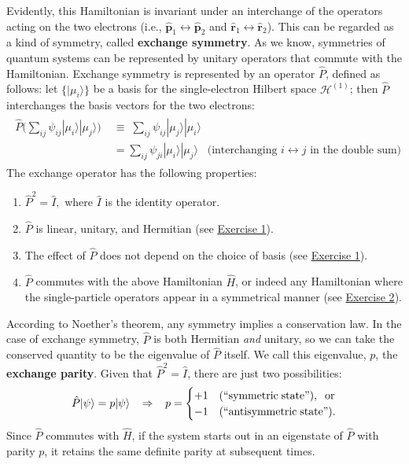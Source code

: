 \documentclass[pra,12pt]{revtex4}
\begin{document}
Evidently, this Hamiltonian is invariant under an interchange of the
operators acting on the two electrons (i.e., $\hat{\mathbf{p}}_1
\leftrightarrow \hat{\mathbf{p}}_2$ and $\hat{\mathbf{r}}_1
\leftrightarrow \hat{\mathbf{r}}_2$).  This can be regarded as a kind
of symmetry, called \textbf{exchange symmetry}.  As we know,
symmetries of quantum systems can be represented by unitary operators
that commute with the Hamiltonian.  Exchange symmetry is represented
by an operator $\hat{P}$, defined as follows: let $\{|\mu_i\rangle\}$
be a basis for the single-electron Hilbert space $\mathscr{H}^{(1)}$;
then $\hat{P}$ interchanges the basis vectors for the two electrons:
\begin{align}
  \begin{aligned}\hat{P} \Big (\sum_{ij} \psi_{ij} |\mu_i\rangle|\mu_j\rangle \Big)
    \;&\equiv\;  \sum_{ij} \psi_{ij} |\mu_j\rangle|\mu_i\rangle \\&= \sum_{ij} \psi_{ji} |\mu_i\rangle|\mu_j\rangle \;\;\;\textrm{(interchanging $i\leftrightarrow j$ in the double sum)}\end{aligned}
\end{align}
The exchange operator has the following properties:
\begin{enumerate}
\item $\hat{P}^2 = \hat{I},$ where $\hat{I}$ is the identity operator.

\item $\hat{P}$ is linear, unitary, and Hermitian (see
  \hyperref[ex:1]{Exercise 1}).
  
\item The effect of $\hat{P}$ does not depend on the choice
  of basis (see \hyperref[ex:1]{Exercise 1}).

\item $\hat{P}$ commutes with the above Hamiltonian $\hat{H}$, or
  indeed any Hamiltonian where the single-particle operators appear in
  a symmetrical manner (see \hyperref[ex:2]{Exercise 2}).
\end{enumerate}

According to Noether's theorem, any symmetry implies a conservation
law.  In the case of exchange symmetry, $\hat{P}$ is both Hermitian
\textit{and} unitary, so we can take the conserved quantity to be the
eigenvalue of $\hat{P}$ itself.  We call this eigenvalue, $p$, the
\textbf{exchange parity}.  Given that $\hat{P}^2 = \hat{I}$, there are
just two possibilities:
\begin{equation}
  \hat{P} |\psi\rangle = p|\psi\rangle \;\;\;\Rightarrow\;\;\; p = \begin{cases}+1 & \textrm{(``symmetric\;state'')}, \;\;\textrm{or} \\ -1 & \textrm{(``antisymmetric\;state'').}\end{cases}
\end{equation}
Since $\hat{P}$ commutes with $\hat{H}$, if the system starts out in
an eigenstate of $\hat{P}$ with parity $p$, it retains the same
definite parity at subsequent times.
\end{document}

